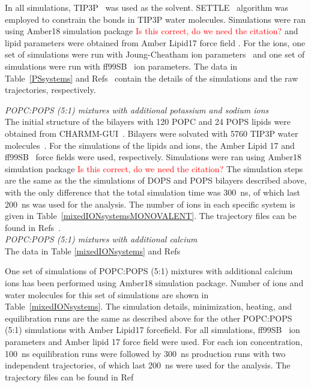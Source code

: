 \documentclass[journal=jpcbfk]{achemso}
\newcommand{\todo}[1]{\textcolor{red}{#1}}
\begin{document}
In all simulations, TIP3P~\cite{jorgensen1983comparison} was used as the solvent. SETTLE~\cite{miyamoto92} algorithm was employed 
to constrain the bonds in TIP3P water molecules. Simulations were ran using Amber18 simulation package \cite{??} \todo{Is this correct, do we need the citation?}
and lipid parameters were obtained from Amber Lipid17 force field \cite{gould18}. For the ions, one set of simulations were run with Joung-Cheatham
ion parameters~\cite{joung2008determination} and one set of simulations were run with ff99SB~\cite{aqvist90} ion parameters. The data in Table~\ref{PSsystems} and Refs~ contain the details of the simulations and the raw trajectories, respectively.

\noindent
{\it POPC:POPS (5:1) mixtures with additional potassium and sodium ions} \\

The initial structure of the bilayers with 120 POPC and 24 POPS lipids were obtained from CHARMM-GUI~\cite{lee16,jo18}.
Bilayers were solvated with 5760 TIP3P water molecules~\cite{jorgensen1983comparison}. For the simulations of the lipids and ions,
the Amber Lipid 17 \cite{gould18} and ff99SB~\cite{aqvist90} force fields were used, respectively.
Simulations were ran using Amber18 simulation package \cite{??} \todo{Is this correct, do we need the citation?}
The simulation steps are the same as the the simulations of
DOPS and POPS bilayers described above, with the only difference that the total simulation time was 300~ns, of which last 200~ns
was used for the analysis. The number of ions in each specific system is given in Table~\ref{mixedIONsystemsMONOVALENT}.
The trajectory files can be found in Refs~.\\

\noindent
{\it POPC:POPS (5:1) mixtures with additional calcium} \\
The data in Table \ref{mixedIONsystems} and Refs  

One set of simulations of POPC:POPS (5:1) mixtures with additional calcium ions has been performed using Amber18 simulation package. Number of ions and water molecules for this set of simulations are shown in Table~\ref{mixedIONsystems}. The simulation details, minimization, heating, and equilibration runs are the same as described above for the other POPC:POPS (5:1) simulations with Amber Lipid17 forcefield. For all simulations, ff99SB~\cite{aqvist90} ion parameters and Amber lipid 17 force field were used. For each ion concentration, 100~ns equilibration runs were followed by 300~ns production runs with two independent trajectories, of which last 200~ns were used for the analysis. The trajectory files can be found in Ref~ 
\end{document}
